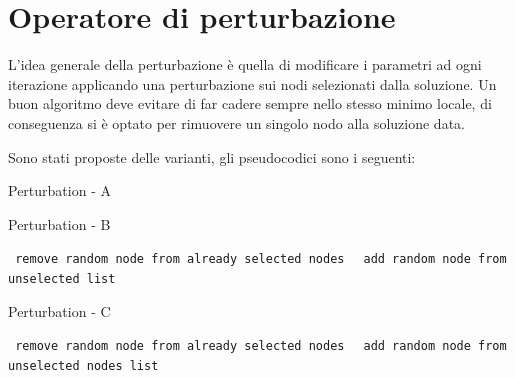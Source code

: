 \documentclass[11pt]{article}
\begin{document}
\pagebreak

\section{Operatore di perturbazione}

L'idea generale della perturbazione è quella di modificare i parametri ad ogni iterazione applicando una perturbazione sui nodi selezionati dalla soluzione.
Un buon algoritmo deve evitare di far cadere sempre nello stesso minimo locale, di conseguenza si è optato per rimuovere un singolo nodo alla soluzione data.

Sono stati proposte delle varianti, gli pseudocodici sono i seguenti:

\begin{algorithm}
\caption{Perturbation - A}
\begin{algorithmic}
\end{algorithmic}
\end{algorithm}


\begin{algorithm}
    \caption{Perturbation - B}
    \begin{algorithmic}
    
        \State \texttt{
            remove random node from already selected nodes
        }
        \State \texttt{
            add random node from unselected list
        }
    \EndFor
    
\end{algorithmic}
\end{algorithm}


\begin{algorithm}
    \caption{Perturbation - C}
    \begin{algorithmic}

        \State \texttt{
            remove random node from already selected nodes
        }
    \EndFor
            \State \texttt{
                add random node from unselected nodes list
            }
        \EndFor
    \EndIf
\end{algorithmic}
\end{algorithm}
\end{document}
